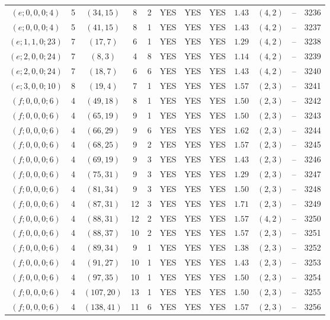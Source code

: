 \begin{longtable}{|c|c|c|c|c|c|c|c|c|c|c|c|}
$(e;0,0,0;4)$ & 5 & $(34,15)$ & 8 & 2 & YES & YES & YES & $1.43$ & $(4,2)$ & -- & 3236\\
$(e;0,0,0;4)$ & 5 & $(41,15)$ & 8 & 1 & YES & YES & YES & $1.43$ & $(4,2)$ & -- & 3237\\
$(e;1,1,0;23)$ & 7 & $(17,7)$ & 6 & 1 & YES & YES & YES & $1.29$ & $(4,2)$ & -- & 3238\\
$(e;2,0,0;24)$ & 7 & $(8,3)$ & 4 & 8 & YES & YES & YES & $1.14$ & $(4,2)$ & -- & 3239\\
$(e;2,0,0;24)$ & 7 & $(18,7)$ & 6 & 6 & YES & YES & YES & $1.43$ & $(4,2)$ & -- & 3240\\
$(e;3,0,0;10)$ & 8 & $(19,4)$ & 7 & 1 & YES & YES & YES & $1.57$ & $(2,3)$ & -- & 3241\\
$(f;0,0,0;6)$ & 4 & $(49,18)$ & 8 & 1 & YES & YES & YES & $1.50$ & $(2,3)$ & -- & 3242\\
$(f;0,0,0;6)$ & 4 & $(65,19)$ & 9 & 1 & YES & YES & YES & $1.50$ & $(2,3)$ & -- & 3243\\
$(f;0,0,0;6)$ & 4 & $(66,29)$ & 9 & 6 & YES & YES & YES & $1.62$ & $(2,3)$ & -- & 3244\\
$(f;0,0,0;6)$ & 4 & $(68,25)$ & 9 & 2 & YES & YES & YES & $1.57$ & $(2,3)$ & -- & 3245\\
$(f;0,0,0;6)$ & 4 & $(69,19)$ & 9 & 3 & YES & YES & YES & $1.43$ & $(2,3)$ & -- & 3246\\
$(f;0,0,0;6)$ & 4 & $(75,31)$ & 9 & 3 & YES & YES & YES & $1.29$ & $(2,3)$ & -- & 3247\\
$(f;0,0,0;6)$ & 4 & $(81,34)$ & 9 & 3 & YES & YES & YES & $1.50$ & $(2,3)$ & -- & 3248\\
$(f;0,0,0;6)$ & 4 & $(87,31)$ & 12 & 3 & YES & YES & YES & $1.71$ & $(2,3)$ & -- & 3249\\
$(f;0,0,0;6)$ & 4 & $(88,31)$ & 12 & 2 & YES & YES & YES & $1.57$ & $(4,2)$ & -- & 3250\\
$(f;0,0,0;6)$ & 4 & $(88,37)$ & 10 & 2 & YES & YES & YES & $1.57$ & $(2,3)$ & -- & 3251\\
$(f;0,0,0;6)$ & 4 & $(89,34)$ & 9 & 1 & YES & YES & YES & $1.38$ & $(2,3)$ & -- & 3252\\
$(f;0,0,0;6)$ & 4 & $(91,27)$ & 10 & 1 & YES & YES & YES & $1.43$ & $(2,3)$ & -- & 3253\\
$(f;0,0,0;6)$ & 4 & $(97,35)$ & 10 & 1 & YES & YES & YES & $1.50$ & $(2,3)$ & -- & 3254\\
$(f;0,0,0;6)$ & 4 & $(107,20)$ & 13 & 1 & YES & YES & YES & $1.50$ & $(2,3)$ & -- & 3255\\
$(f;0,0,0;6)$ & 4 & $(138,41)$ & 11 & 6 & YES & YES & YES & $1.57$ & $(2,3)$ & -- & 3256\\

\end{longtable}
